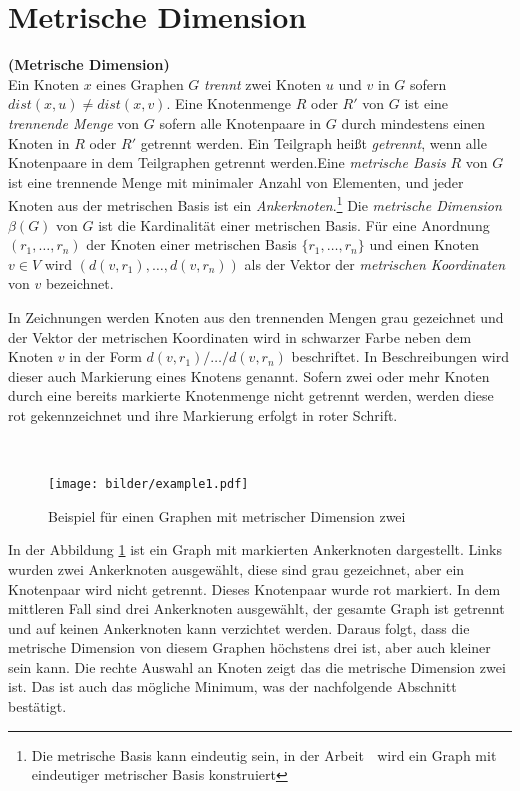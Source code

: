 \section{Metrische Dimension}
\label{MDT}
\begin{defi}{\textbf{(Metrische Dimension)}}\\
Ein Knoten $x$ eines Graphen $G$ \emph{trennt} zwei Knoten $u$ und $v$ in $G$ sofern $dist(x, u) \neq dist(x, v)$. Eine Knotenmenge $R$ oder $R'$ von $G$ ist eine \emph{trennende Menge} von $G$ sofern alle Knotenpaare in $G$ durch mindestens einen Knoten in $R$ oder $R'$ getrennt werden. Ein Teilgraph heißt \emph{getrennt}, wenn alle Knotenpaare in dem Teilgraphen getrennt werden.\newline \newline Eine \emph{metrische Basis} $R$ von $G$ ist eine trennende Menge mit minimaler Anzahl von Elementen, und jeder Knoten aus der metrischen Basis ist ein \emph{Ankerknoten}.\footnote{Die metrische Basis kann eindeutig sein, in der Arbeit \grqq$\;$\cite{bases} wird ein Graph mit eindeutiger metrischer Basis konstruiert} \newline\newline %
Die \emph{metrische Dimension $\beta(G)$} von $G$ ist die Kardinalität einer metrischen Basis. Für eine Anordnung $(r_1,\ldots,r_n)$ der Knoten einer metrischen Basis $\{r_1,\ldots,r_n\}$ und einen Knoten $v \in V$ wird $(d(v, r_1 ), \ldots , d(v, r_n ))$ als der Vektor der \emph{metrischen Koordinaten} von $v$ bezeichnet.
\end{defi}
\begin{bem}
In Zeichnungen werden Knoten aus den trennenden Mengen grau gezeichnet und der Vektor der metrischen Koordinaten wird in schwarzer Farbe neben dem Knoten $v$ in der Form $d(v, r_1 )/ \ldots / d(v, r_n )$ beschriftet. In Beschreibungen wird dieser auch Markierung eines Knotens genannt. Sofern zwei oder mehr Knoten durch eine bereits markierte Knotenmenge nicht getrennt werden, werden diese rot gekennzeichnet und ihre Markierung erfolgt in roter Schrift. 
\end{bem}
\begin{bsp}~
\begin{figure}[h!]
		\centering 		 
   \texttt{[image: bilder/example1.pdf]}
	\caption{Beispiel für einen Graphen mit metrischer Dimension zwei}
  	 \label{bild:bsp}
  	 \end{figure}
In der Abbildung \ref{bild:bsp} ist ein Graph mit markierten Ankerknoten dargestellt.
Links wurden zwei Ankerknoten ausgewählt, diese sind grau gezeichnet, aber ein Knotenpaar wird nicht getrennt. Dieses Knotenpaar wurde rot markiert. In dem mittleren Fall sind drei Ankerknoten ausgewählt, der gesamte Graph ist getrennt und auf keinen Ankerknoten kann verzichtet werden. Daraus folgt, dass die metrische Dimension von diesem Graphen höchstens drei ist, aber auch kleiner sein kann. Die rechte Auswahl an Knoten zeigt das die metrische Dimension zwei ist. Das ist auch das mögliche Minimum, was der nachfolgende Abschnitt bestätigt.
\end{bsp}
